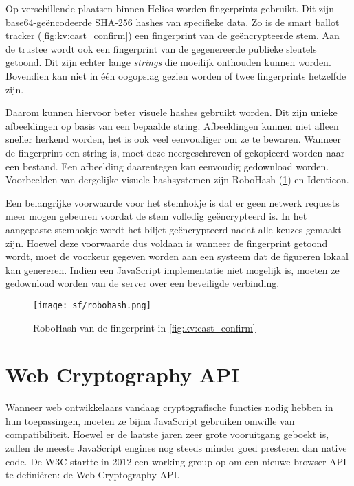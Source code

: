 Op verschillende plaatsen binnen Helios worden fingerprints gebruikt. Dit zijn base64-ge\"encodeerde SHA-256 hashes van specifieke data.\cite{fips_180_4} Zo is de smart ballot tracker (\ref{fig:kv:cast_confirm}) een fingerprint van de ge\"encrypteerde stem. Aan de trustee wordt ook een fingerprint van de gegenereerde publieke sleutels getoond. Dit zijn echter lange \textit{strings} die moeilijk onthouden kunnen worden. Bovendien kan niet in \'e\'en oogopslag gezien worden of twee fingerprints hetzelfde zijn.

\npar Daarom kunnen hiervoor beter visuele hashes gebruikt worden. Dit zijn unieke afbeeldingen op basis van een bepaalde string. Afbeeldingen kunnen niet alleen sneller herkend worden, het is ook veel eenvoudiger om ze te bewaren. Wanneer de fingerprint een string is, moet deze neergeschreven of gekopieerd worden naar een bestand. Een afbeelding daarentegen kan eenvoudig gedownload worden. Voorbeelden van dergelijke visuele hashsystemen zijn RoboHash (\ref{fig:sf:robohash}) en Identicon.\cite{site:robohash}\cite{site:identicon}

\npar Een belangrijke voorwaarde voor het stemhokje is dat er geen netwerk requests meer mogen gebeuren voordat de stem volledig ge\"encrypteerd is.\cite{adida_helios} In het aangepaste stemhokje wordt het biljet ge\"encrypteerd nadat alle keuzes gemaakt zijn. Hoewel deze voorwaarde dus voldaan is wanneer de fingerprint getoond wordt, moet de voorkeur gegeven worden aan een systeem dat de figureren lokaal kan genereren. Indien een JavaScript implementatie niet mogelijk is, moeten ze gedownload worden van de server over een beveiligde verbinding.

\begin{figure}
  \centering
  \texttt{[image: sf/robohash.png]}
  \caption{RoboHash van de fingerprint in \ref{fig:kv:cast_confirm}}
  \label{fig:sf:robohash}
\end{figure}

\section{Web Cryptography API}
\label{chap:web_cryptography_api}

Wanneer web ontwikkelaars vandaag cryptografische functies nodig hebben in hun toepassingen, moeten ze bijna JavaScript gebruiken omwille van compatibiliteit. Hoewel er de laatste jaren zeer grote vooruitgang geboekt is, zullen de meeste JavaScript engines nog steeds minder goed presteren dan native code.\cite{site:resig_javascript_performance_rundown}\cite{site:cois_javascript_performance_rundown_2012}\cite{smedberg_performance_analysis_of_javascript} De W3C startte in 2012 een working group op om een nieuwe browser API te defini\"eren: de Web Cryptography API.\cite{wiki:webcrypto}

